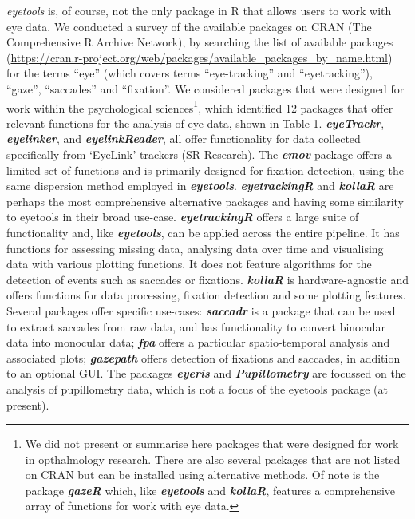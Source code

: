 \documentclass[
  man,
  floatsintext,
  longtable,
  nolmodern,
  notxfonts,
  notimes,
  colorlinks=true,linkcolor=blue,citecolor=blue,urlcolor=blue]{apa7}
\begin{document}
\emph{eyetools} is, of course, not the only package in R that allows
users to work with eye data. We conducted a survey of the available
packages on CRAN (The Comprehensive R Archive Network), by searching the
list of available packages
(\url{https://cran.r-project.org/web/packages/available_packages_by_name.html})
for the terms ``eye'' (which covers terms ``eye-tracking'' and
``eyetracking''), ``gaze'', ``saccades'' and ``fixation''. We considered
packages that were designed for work within the psychological
sciences\footnote{We did not present or summarise here packages that
  were designed for work in opthalmology research. There are also
  several packages that are not listed on CRAN but can be installed
  using alternative methods. Of note is the package
  \textbf{\emph{gazeR}} which, like \textbf{\emph{eyetools}} and
  \textbf{\emph{kollaR}}, features a comprehensive array of functions
  for work with eye data.}, which identified 12 packages that offer
relevant functions for the analysis of eye data, shown in Table 1.
\textbf{\emph{eyeTrackr}}, \textbf{\emph{eyelinker}}, and
\textbf{\emph{eyelinkReader}}, all offer functionality for data
collected specifically from `EyeLink' trackers (SR Research). The
\textbf{\emph{emov}} package offers a limited set of functions and is
primarily designed for fixation detection, using the same dispersion
method employed in \textbf{\emph{eyetools}}.
\textbf{\emph{eyetrackingR}} and \textbf{\emph{kollaR}} are perhaps the
most comprehensive alternative packages and having some similarity to
eyetools in their broad use-case. \textbf{\emph{eyetrackingR}} offers a
large suite of functionality and, like \textbf{\emph{eyetools}}, can be
applied across the entire pipeline. It has functions for assessing
missing data, analysing data over time and visualising data with various
plotting functions. It does not feature algorithms for the detection of
events such as saccades or fixations. \textbf{\emph{kollaR}} is
hardware-agnostic and offers functions for data processing, fixation
detection and some plotting features. Several packages offer specific
use-cases: \textbf{\emph{saccadr}} is a package that can be used to
extract saccades from raw data, and has functionality to convert
binocular data into monocular data; \textbf{\emph{fpa}} offers a
particular spatio-temporal analysis and associated plots;
\textbf{\emph{gazepath}} offers detection of fixations and saccades, in
addition to an optional GUI. The packages \textbf{\emph{eyeris}} and
\textbf{\emph{Pupillometry}} are focussed on the analysis of
pupillometry data, which is not a focus of the eyetools package (at
present).
\end{document}
